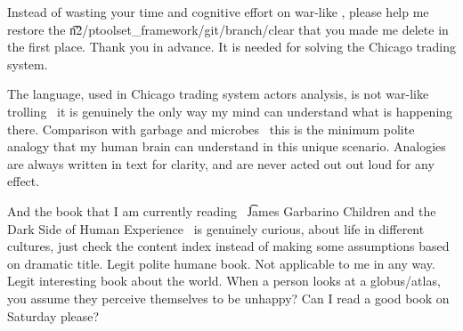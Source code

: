 Instead of wasting your time and cognitive effort on war-like  , please help me restore the \t{n2/ptoolset_framework/git/branch/clear} that you made me delete in the first place. Thank you in advance. It is needed for solving the Chicago trading system.

The language, used in Chicago trading system actors analysis, is not war-like trolling \emdash\ it is genuinely the only way my mind can understand what is happening there. Comparison with garbage and microbes \emdash\ this is the minimum polite analogy that my human brain can understand in this unique scenario. Analogies are always written in text for clarity, and are never acted out out loud for any effect.

And the book that I am currently reading \emdash\ \t{James Garbarino Children and the Dark Side of Human Experience} \emdash\ is genuinely curious, about life in different cultures, just check the content index instead of making some assumptions based on dramatic title. Legit polite humane book. Not applicable to me in any way. Legit interesting book about the world. When a person looks at a globus/atlas, you assume they perceive themselves to be unhappy? Can I read a good book on Saturday please?
